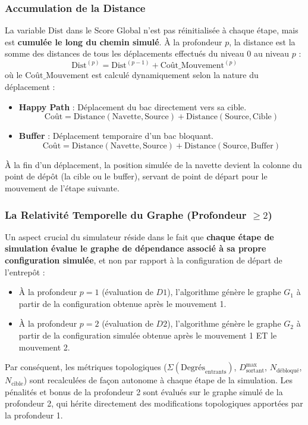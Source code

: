 \documentclass[11pt,a4paper]{article}
\begin{document}
\subsubsection{Accumulation de la Distance}
La variable $\text{Dist}$ dans le Score Global n'est pas réinitialisée à chaque étape, mais est \textbf{cumulée le long du chemin simulé}. À la profondeur $p$, la distance est la somme des distances de tous les déplacements effectués du niveau 0 au niveau $p$ :
\begin{equation*}
    \text{Dist}^{(p)} = \text{Dist}^{(p-1)} + \text{Coût\_Mouvement}^{(p)}
\end{equation*}
où le $\text{Coût\_Mouvement}$ est calculé dynamiquement selon la nature du déplacement :
\begin{itemize}[noitemsep]
    \item \textbf{Happy Path} : Déplacement du bac directement vers sa cible.
    \begin{equation*}
        \text{Coût} = \text{Distance}(\text{Navette}, \text{Source}) + \text{Distance}(\text{Source}, \text{Cible})
    \end{equation*}
    \item \textbf{Buffer} : Déplacement temporaire d'un bac bloquant.
    \begin{equation*}
        \text{Coût} = \text{Distance}(\text{Navette}, \text{Source}) + \text{Distance}(\text{Source}, \text{Buffer})
    \end{equation*}
\end{itemize}
À la fin d'un déplacement, la position simulée de la navette devient la colonne du point de dépôt (la cible ou le buffer), servant de point de départ pour le mouvement de l'étape suivante.

\subsubsection{La Relativité Temporelle du Graphe (Profondeur $\ge 2$)}
Un aspect crucial du simulateur réside dans le fait que \textbf{chaque étape de simulation évalue le graphe de dépendance associé à sa propre configuration simulée}, et non par rapport à la configuration de départ de l'entrepôt :
\begin{itemize}
    \item À la profondeur $p=1$ (évaluation de $D1$), l'algorithme génère le graphe $G_1$ à partir de la configuration obtenue après le mouvement 1.
    \item À la profondeur $p=2$ (évaluation de $D2$), l'algorithme génère le graphe $G_2$ à partir de la configuration simulée obtenue après le mouvement 1 ET le mouvement 2.
\end{itemize}
Par conséquent, les métriques topologiques ($\Sigma(\text{Degrés}_{\text{entrants}})$, $D^{\text{max}}_{\text{sortant}}$, $N_{\text{débloqué}}$, $N_{\text{cible}}$) sont recalculées de façon autonome à chaque étape de la simulation. Les pénalités et bonus de la profondeur 2 sont évalués sur le graphe simulé de la profondeur 2, qui hérite directement des modifications topologiques apportées par la profondeur 1.
\end{document}
